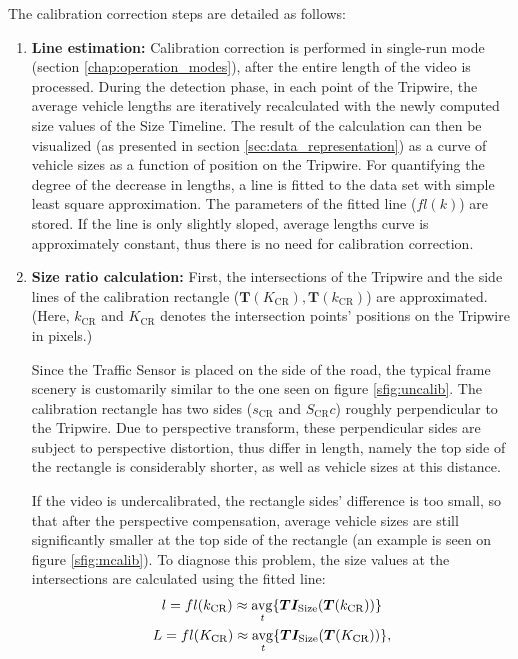 \noindent The calibration correction steps are detailed as follows:
\begin{enumerate}[align=parleft]
	\item  \textbf{Line estimation:} 
	Calibration correction is performed in single-run mode (section \ref{chap:operation_modes}), after the entire length of the video is processed.
	During the detection phase, in each point of the Tripwire, the average vehicle lengths are iteratively recalculated with the newly computed size values of the Size Timeline.
	The result of the calculation can then be visualized (as presented in section \ref{sec:data_representation}) as a curve of vehicle sizes as a function of position on the Tripwire.
	For quantifying the degree of the decrease in lengths, a line is fitted to the data set with simple least square approximation.
	The parameters of the fitted line ($fl(k)$) are stored.
	If the line is only slightly sloped, average lengths curve is approximately constant, thus there is no need for calibration correction. 
	
	\item  \textbf{Size ratio calculation:}
	First, the intersections of the Tripwire and the side lines of the calibration rectangle ($\boldsymbol{T}(K_{\text{CR}}), \boldsymbol{T}(k_{\text{CR}})$) are approximated.
	(Here, $k_{\text{CR}}$ and $K_{\text{CR}}$ denotes the intersection points' positions on the Tripwire in pixels.)
	
	Since the Traffic Sensor is placed on the side of the road, the typical frame scenery is customarily similar to the one seen on figure \ref{sfig:uncalib}.
	The calibration rectangle has two sides ($s_{\text{CR}}$ and $S_{\text{CR}}c$) roughly perpendicular to the Tripwire.
	Due to perspective transform, these perpendicular sides are subject to perspective distortion, thus differ in length, namely the top side of the rectangle is considerably shorter, as well as vehicle sizes at this distance.
	
	If the video is undercalibrated, the rectangle sides' difference is too small, so that after the perspective compensation, average vehicle sizes are still significantly smaller at the top side of the rectangle (an example is seen on figure \ref{sfig:mcalib}).
	To diagnose this problem, the size values at the intersections are calculated using the fitted line:
	\begin{gather*}
		l = fl(k_{\text{CR}}) \approx \operatorname{\underset{\textit{t}}{avg}}\{\boldsymbol{TI_{\text{Size}}}(\boldsymbol{T}(k_{\text{CR}}))\} \\
		L = fl(K_{\text{CR}}) \approx \operatorname{\underset{\textit{t}}{avg}}\{\boldsymbol{TI_{\text{Size}}}(\boldsymbol{T}(K_{\text{CR}}))\},
	\end{gather*}
	

\end{enumerate}
